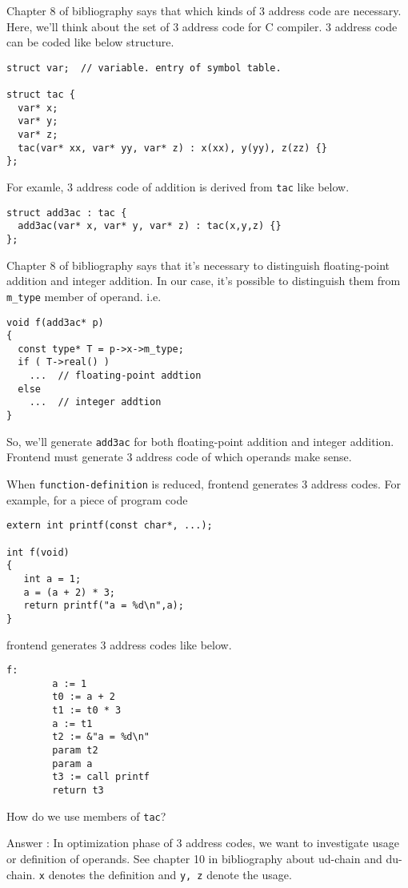 \label{_3ac_e001}
Chapter 8 of bibliography \cite{doragon} says that
which kinds of 3 address code are necessary.
Here, we'll think about the set of 3 address code for C compiler.
3 address code can be coded like below structure.
\begin{verbatim}
struct var;  // variable. entry of symbol table.

struct tac {
  var* x;
  var* y;
  var* z;
  tac(var* xx, var* yy, var* z) : x(xx), y(yy), z(zz) {}
};
\end{verbatim}
For examle, 3 address code of addition is
derived from {\tt{tac}} like below.
\begin{verbatim}
struct add3ac : tac {
  add3ac(var* x, var* y, var* z) : tac(x,y,z) {}
};
\end{verbatim}
Chapter 8 of bibliography \cite{doragon} says that
it's necessary to distinguish floating-point addition and
integer addition. In our case, it's possible to distinguish
them from {\tt {m\_type}} member of operand. i.e.
\begin{verbatim}
void f(add3ac* p)
{
  const type* T = p->x->m_type;
  if ( T->real() )
    ...  // floating-point addtion
  else
    ...  // integer addtion
}
\end{verbatim}
So, we'll generate {\tt{add3ac}} for both floating-point addition
and integer addition. Frontend must generate 3 address code
of which operands make sense.

When {\tt{function-definition}} is reduced, frontend generates
3 address codes. For example, for a piece of program code
\begin{verbatim}
extern int printf(const char*, ...);

int f(void)
{
   int a = 1;
   a = (a + 2) * 3;
   return printf("a = %d\n",a);
}
\end{verbatim}
frontend generates 3 address codes like below.
\begin{verbatim}
f:
        a := 1
        t0 := a + 2
        t1 := t0 * 3
        a := t1
        t2 := &"a = %d\n"
        param t2
        param a
        t3 := call printf
        return t3
\end{verbatim}

\begin{QandA}
How do we use members of {\tt{tac}}?

Answer : In optimization phase of 3 address codes, we want to
investigate usage or definition of operands. See chapter 10 in
bibliography \cite{doragon} about ud-chain and du-chain.
{\tt{x}} denotes the definition and {\tt{y, z}} denote the usage.
\end{QandA}


